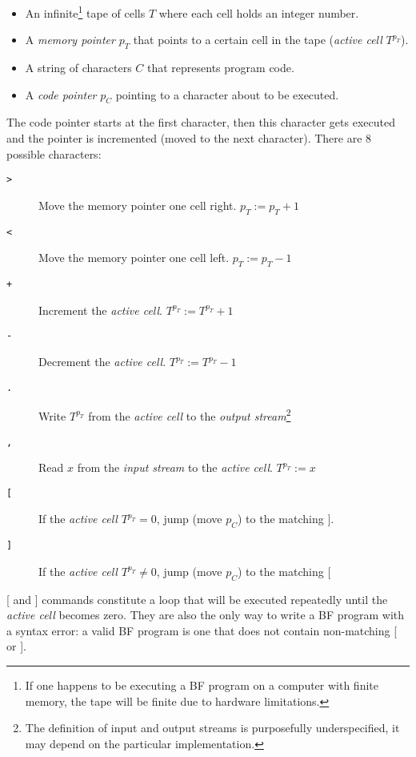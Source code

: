 \begin{itemize}
    \item An infinite\footnote{If one happens to be executing a BF program on a computer with finite memory, the tape will be finite due to hardware limitations.} tape of cells $T$ where each cell holds an integer number.
    \item A \textit{memory pointer} $p_T$ that points to a certain cell in the tape (\textit{active cell} $T^{p_T}$).
    \item A string of characters $C$ that represents program code.
    \item A \textit{code pointer} $p_C$ pointing to a character about to be executed.
\end{itemize}

The code pointer starts at the first character, then this character gets executed and the pointer is incremented (moved to the next character).
There are 8 possible characters:

\begin{description}
\item[\texttt{>}] Move the memory pointer one cell right. $p_T := p_T + 1$
\item[\texttt{<}] Move the memory pointer one cell left. $p_T := p_T - 1$
\item[\texttt{+}] Increment the \textit{active cell}. $T^{p_T} := T^{p_T} + 1$
\item[\texttt{-}] Decrement the \textit{active cell}. $T^{p_T} := T^{p_T} - 1$
\item[\texttt{.}] Write $T^{p_T}$ from the \textit{active cell} to the \textit{output stream}\footnote{The definition of input and output streams is purposefully underspecified, it may depend on the particular implementation.}
\item[\texttt{,}] Read $x$ from the \textit{input stream} to the \textit{active cell}. $T^{p_T} := x$
\item[ \texttt{[} ] If the \textit{active cell} $T^{p_T} = 0$, jump (move $p_C$) to the matching $]$.
\item[ \texttt{]} ] If the \textit{active cell} $T^{p_T} \neq 0$, jump (move $p_C$) to the matching $[$
\end{description}

[ and ] commands constitute a loop that will be executed repeatedly until the \textit{active cell} becomes zero.
They are also the only way to write a BF program with a syntax error: a valid BF program is one that does not contain non-matching [ or ].

